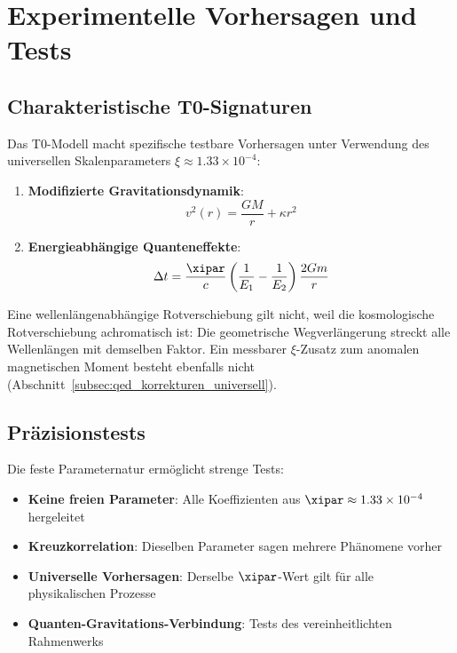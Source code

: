 	\section{Experimentelle Vorhersagen und Tests}
	\label{sec:experimentelle_vorhersagen}
	
	\subsection{Charakteristische T0-Signaturen}
	\label{subsec:charakteristische_signaturen}
	
	Das T0-Modell macht spezifische testbare Vorhersagen unter Verwendung des universellen Skalenparameters $\xi \approx 1.33 \times 10^{-4}$:
	
	\begin{enumerate}
		\item \textbf{Modifizierte Gravitationsdynamik}:
		\begin{equation}
			v^2(r) = \frac{GM}{r} + \kappa r^2
			\label{eq:rotationskurve_vorhersage}
		\end{equation}
		
		\item \textbf{Energieabhängige Quanteneffekte}:
		\begin{equation}
			\Delta t = \frac{\xipar}{c} \left(\frac{1}{E_1} - \frac{1}{E_2}\right) \frac{2Gm}{r}
			\label{eq:quanten_zeitverzoegerung}
		\end{equation}
	\end{enumerate}
	
	Eine wellenlängenabhängige Rotverschiebung gilt nicht, weil die kosmologische Rotverschiebung achromatisch ist: Die geometrische Wegverlängerung streckt alle Wellenlängen mit demselben Faktor. Ein messbarer $\xi$-Zusatz zum anomalen magnetischen Moment besteht ebenfalls nicht (Abschnitt~\ref{subsec:qed_korrekturen_universell}).
	
	\subsection{Präzisionstests}
	\label{subsec:praezisionstests}
	
	Die feste Parameternatur ermöglicht strenge Tests:
	\begin{itemize}
		\item \textbf{Keine freien Parameter}: Alle Koeffizienten aus $\xipar \approx 1.33 \times 10^{-4}$ hergeleitet
		\item \textbf{Kreuzkorrelation}: Dieselben Parameter sagen mehrere Phänomene vorher
		\item \textbf{Universelle Vorhersagen}: Derselbe $\xipar$-Wert gilt für alle physikalischen Prozesse
		\item \textbf{Quanten-Gravitations-Verbindung}: Tests des vereinheitlichten Rahmenwerks
	\end{itemize}
	
